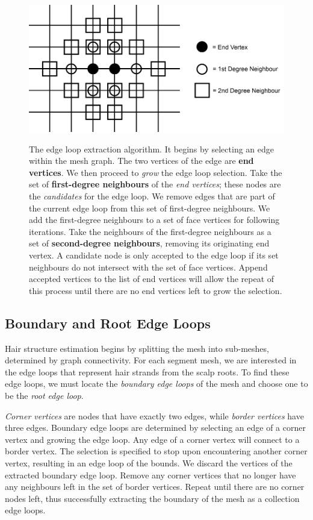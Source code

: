 \documentclass[ %
author={Dillon Keith Diep},
supervisor={Dr. Carl Henrik Ek},
degree={MEng},
title={ART-CG Hair:},
subtitle={Assisted Real-time Content Generation of Stylised Virtual Hair},
type={Research},
year={2017} ]{dissertation}
\begin{document}
	\begin{figure}[!h]
		\centering
		\caption{The edge loop extraction algorithm. It begins by selecting an edge within the mesh graph. The two vertices of the edge are \textbf{end vertices}. We then proceed to \textit{grow} the edge loop selection. Take the set of \textbf{first-degree neighbours} of the \textit{end vertices}; these nodes are the \textit{candidates} for the edge loop. We remove edges that are part of the current edge loop from this set of first-degree neighbours. We add the first-degree neighbours to a set of face vertices for following iterations. Take the neighbours of the first-degree neighbours as a set of \textbf{second-degree neighbours}, removing its originating end vertex. A candidate node is only accepted to the edge loop if its set neighbours do not intersect with the set of face vertices. Append accepted vertices to the list of end vertices will allow the repeat of this process until there are no end vertices left to grow the selection.}
		\includegraphics[scale=0.35]{images/edgeLoopDiagram}\\
		\label{edgeLoopFig}
	\end{figure}
	
	\subsection{Boundary and Root Edge Loops}
	Hair structure estimation begins by splitting the mesh into sub-meshes, determined by graph connectivity. For each segment mesh, we are interested in the edge loops that represent hair strands from the scalp roots. To find these edge loops, we must locate the \textit{boundary edge loops} of the mesh and choose one to be the \textit{root edge loop}.
	
	\textit{Corner vertices} are nodes that have exactly two edges, while \textit{border vertices} have three edges. Boundary edge loops are determined by selecting an edge of a corner vertex and growing the edge loop. Any edge of a corner vertex will connect to a border vertex. The selection is specified to stop upon encountering another corner vertex, resulting in an edge loop of the bounds. We discard the vertices of the extracted boundary edge loop. Remove any corner vertices that no longer have any neighbours left in the set of border vertices. Repeat until there are no corner nodes left, thus successfully extracting the boundary of the mesh as a collection edge loops.
	
\end{document}
